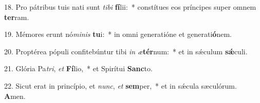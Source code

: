 18. Pro pátribus tuis nati sunt \textit{ti}\textit{bi} \textbf{fí}lii:~*  constítues eos príncipes super omnem \textbf{ter}ram.\

19. Mémores erunt nó\textit{mi}\textit{nis} \textbf{tu}i:~*  in omni generatióne et generati\textbf{ó}nem.\

20. Proptérea pópuli confitebúntur tibi \textit{in} \textit{æ}\textbf{tér}num:~*  et in sǽculum \textbf{sǽ}culi.\

21. Glória Pa\textit{tri}, \textit{et} \textbf{Fí}lio,~*  et Spirítui \textbf{Sanc}to.\

22. Sicut erat in princípio, et \textit{nunc}, \textit{et} \textbf{sem}per,~*  et in sǽcula sæculórum. \textbf{A}men.\

